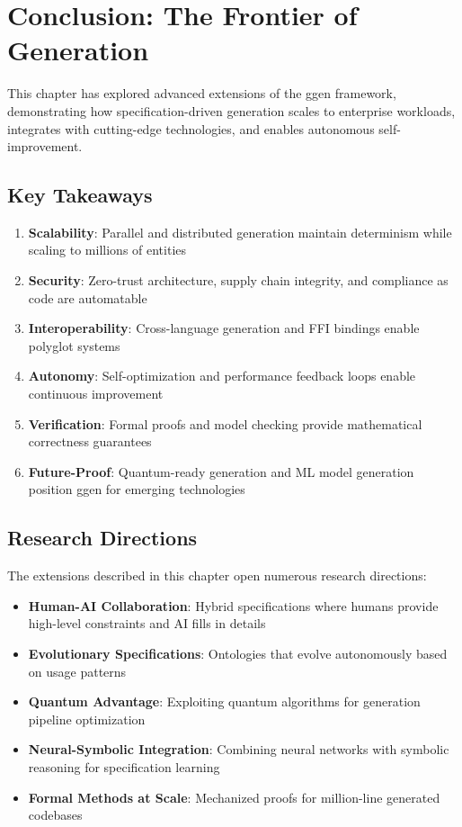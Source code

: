 \section{Conclusion: The Frontier of Generation}

This chapter has explored advanced extensions of the ggen framework, demonstrating how specification-driven generation scales to enterprise workloads, integrates with cutting-edge technologies, and enables autonomous self-improvement.

\subsection{Key Takeaways}

\begin{enumerate}
    \item \textbf{Scalability}: Parallel and distributed generation maintain determinism while scaling to millions of entities
    \item \textbf{Security}: Zero-trust architecture, supply chain integrity, and compliance as code are automatable
    \item \textbf{Interoperability}: Cross-language generation and FFI bindings enable polyglot systems
    \item \textbf{Autonomy}: Self-optimization and performance feedback loops enable continuous improvement
    \item \textbf{Verification}: Formal proofs and model checking provide mathematical correctness guarantees
    \item \textbf{Future-Proof}: Quantum-ready generation and ML model generation position ggen for emerging technologies
\end{enumerate}

\subsection{Research Directions}

The extensions described in this chapter open numerous research directions:

\begin{itemize}
    \item \textbf{Human-AI Collaboration}: Hybrid specifications where humans provide high-level constraints and AI fills in details
    \item \textbf{Evolutionary Specifications}: Ontologies that evolve autonomously based on usage patterns
    \item \textbf{Quantum Advantage}: Exploiting quantum algorithms for generation pipeline optimization
    \item \textbf{Neural-Symbolic Integration}: Combining neural networks with symbolic reasoning for specification learning
    \item \textbf{Formal Methods at Scale}: Mechanized proofs for million-line generated codebases
\end{itemize}


